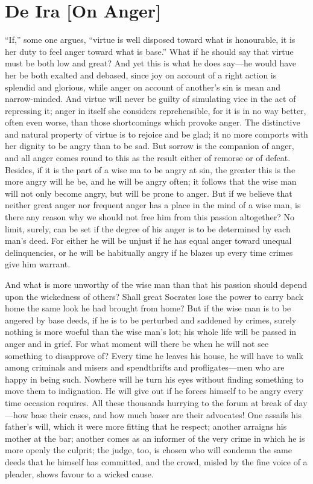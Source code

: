 
\author{Seneca}
\chapter[De Ira {[On Anger]}, bk. 2.6--2.10]{De Ira [On Anger]}

``If,'' some one argues, ``virtue is well disposed toward
what is honourable, it is her duty to feel anger toward what is
base.'' What if he should say that virtue must be both low and great?
And yet this is what he does say---he would have her be both exalted
and debased, since joy on account of a right action is splendid and
glorious, while anger on account of another's sin is mean and
narrow-minded.  And virtue will never be guilty of
simulating vice in the act of repressing it; anger in itself she
considers reprehensible, for it is in no way better, often even worse,
than those shortcomings which provoke anger. The distinctive and
natural property of virtue is to rejoice and be glad; it no more
comports with her dignity to be angry than to be sad. But sorrow is
the companion of anger, and all anger comes round to this as the
result either of remorse or of defeat. Besides, if it is the part of a
wise ma to be angry at sin, the greater this is the more angry will he
be, and he will be angry often; it follows that the wise man will not
only become angry, but will be prone to anger. But if we believe that
neither great anger nor frequent anger has a place in the mind of a
wise man, is there any reason why we should not free him from this
passion altogether? No limit, surely, can be set if the degree of his
anger is to be determined by each man's deed. For either he will be
unjust if he has equal anger toward unequal delinquencies, or he will
be habitually angry if he blazes up every time crimes give him
warrant.

And what is more unworthy of the wise man than that his passion should
depend upon the wickedness of others? Shall great Socrates lose the
power to carry back home the same look he had brought from home? But
if the wise man is to be angered by base deeds, if he is to be
perturbed and saddened by crimes, surely nothing is more woeful than
the wise man's lot; his whole life will be passed in anger and in
grief. For what moment will there be when he will not see something to
disapprove of? Every time he leaves his house, he will have to walk
among criminals and misers and spendthrifts and 
prof\-li\-gates---men who are happy in being such. Nowhere will he
turn his eyes without finding something to move them to indignation.
He will give out if he forces himself to be angry every time occasion
requires. All these thousands hurrying to the forum at break of
day---how base their cases, and how much baser are their advocates!
One assails his father's will, which it were more fitting that he
respect; another arraigns his mother at the bar; another comes as an
informer of the very crime in which he is more openly the culprit; the
judge, too, is chosen who will condemn the same deeds that he himself
has committed, and the crowd, misled by the fine voice of a pleader,
shows favour to a wicked cause.

